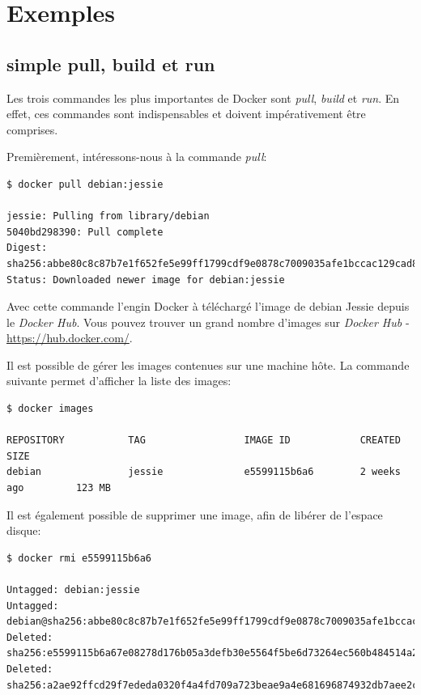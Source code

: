 \section{Exemples}
\subsection{simple pull, build et run}
Les trois commandes les plus importantes de Docker sont \emph{pull}, \emph{build} et \emph{run}. En effet, ces commandes sont indispensables et doivent impérativement être comprises.

Premièrement, intéressons-nous à la commande \emph{pull}:

\begin{lstlisting}[frame=single]
$ docker pull debian:jessie

jessie: Pulling from library/debian
5040bd298390: Pull complete 
Digest: sha256:abbe80c8c87b7e1f652fe5e99ff1799cdf9e0878c7009035afe1bccac129cad8
Status: Downloaded newer image for debian:jessie
\end{lstlisting}

Avec cette commande l'engin Docker à téléchargé l'image de debian Jessie depuis le \emph{Docker Hub}. Vous pouvez trouver un grand nombre d'images sur \emph{Docker Hub} - \hyperref[Docker Hub]{https://hub.docker.com/}.

Il est possible de gérer les images contenues sur une machine hôte. La commande suivante permet d'afficher la liste des images:

\begin{lstlisting}[frame=single]
$ docker images

REPOSITORY           TAG                 IMAGE ID            CREATED             SIZE
debian               jessie              e5599115b6a6        2 weeks ago         123 MB
\end{lstlisting}

Il est également possible de supprimer une image, afin de libérer de l'espace disque:

\begin{lstlisting}[frame=single]
$ docker rmi e5599115b6a6

Untagged: debian:jessie
Untagged: debian@sha256:abbe80c8c87b7e1f652fe5e99ff1799cdf9e0878c7009035afe1bccac129cad8
Deleted: sha256:e5599115b6a67e08278d176b05a3defb30e5564f5be6d73264ec560b484514a2
Deleted: sha256:a2ae92ffcd29f7ededa0320f4a4fd709a723beae9a4e681696874932db7aee2c
\end{lstlisting}


